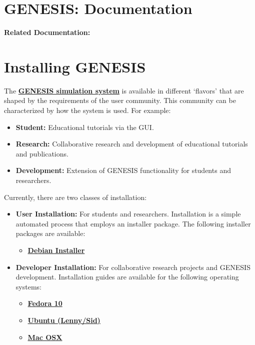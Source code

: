 \documentclass[12pt]{article}
\begin{document}
\section*{GENESIS: Documentation}

{\bf Related Documentation:}

\section*{Installing GENESIS}

The \href{../genesis-overview/genesis-overview.tex}{\bf GENESIS simulation system} is available in different `flavors' that are shaped by the requirements of the user community. This community can be characterized by how the system is used. For example:
\begin{itemize}
   \item[]{\bf Student:} Educational tutorials via the GUI.
   \item[]{\bf Research:} Collaborative research and development of educational tutorials and publications.
   \item[]{\bf Development:} Extension of GENESIS functionality for students and researchers.
\end{itemize}
Currently, there are two classes of installation:

\begin{itemize}
   \item{\bf User Installation:} For students and researchers. Installation is a simple automated process that employs an installer package. The following installer packages are available:
   \begin{itemize}
      \item[] \href{../installation-debian/installation-debian.tex}{\bf Debian Installer}
   \end{itemize}
   
   \item{\bf Developer Installation:} For collaborative research projects and GENESIS development. Installation guides are available for the following operating systems:
      \begin{itemize}
         \item \href{../installation-fedora10/installation-fedora10.tex}{\bf Fedora 10}
         \item \href{../installation-ubuntu-lennysid/installation-ubuntu-lennysid.tex}{\bf Ubuntu (Lenny/Sid)}
         \item \href{../installation-osx/installation-osx.tex}{\bf Mac OSX}
         
         
         
      \end{itemize}   

\end{itemize}
\end{document}
